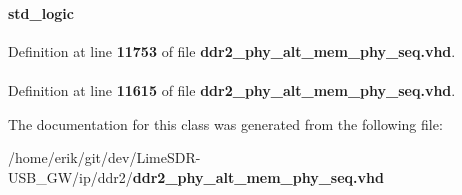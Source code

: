 \paragraph[{waiting\+\_\+for\+\_\+ack}]{ {\bfseries \textcolor{comment}{std\+\_\+logic}\textcolor{vhdlchar}{ }} \hspace{0.3cm}{\ttfamily [Signal]}}\label{classddr2__phy__alt__mem__phy__ctrl_1_1struct_a2e8c8c52e8dd0fb26d0ab65ee257a0ca}


Definition at line {\bf 11753} of file {\bf ddr2\+\_\+phy\+\_\+alt\+\_\+mem\+\_\+phy\+\_\+seq.\+vhd}.

\paragraph[{work}]{\hspace{0.3cm}{\ttfamily [Library]}}\label{classddr2__phy__alt__mem__phy__ctrl_1_1struct_a9f49de6f5eed5b4488cba6c9cdd1c215}


Definition at line {\bf 11615} of file {\bf ddr2\+\_\+phy\+\_\+alt\+\_\+mem\+\_\+phy\+\_\+seq.\+vhd}.



The documentation for this class was generated from the following file\+:\begin{DoxyCompactItemize}
\item 
/home/erik/git/dev/\+Lime\+S\+D\+R-\/\+U\+S\+B\+\_\+\+G\+W/ip/ddr2/{\bf ddr2\+\_\+phy\+\_\+alt\+\_\+mem\+\_\+phy\+\_\+seq.\+vhd}\end{DoxyCompactItemize}
